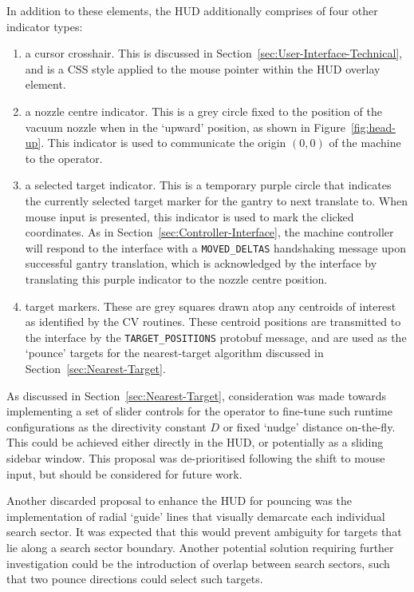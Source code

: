\documentclass[12pt,british,UKenglish]{article}
\begin{document}
In addition to these elements, the \ac{HUD} additionally comprises of four other indicator types:
\begin{enumerate}
    \item a cursor crosshair.
          This is discussed in Section~\ref{sec:User-Interface-Technical}, and is a \ac{CSS} style applied to the mouse pointer within the \ac{HUD} overlay element.
    \item a nozzle centre indicator.
          This is a grey circle fixed to the position of the vacuum nozzle when in the `upward' position, as shown in Figure~\ref{fig:head-up}.
          This indicator is used to communicate the origin $(0, 0)$ of the machine to the operator.
    \item a selected target indicator.
          This is a temporary purple circle that indicates the currently selected target marker for the gantry to next translate to.
          When mouse input is presented, this indicator is used to mark the clicked coordinates.
          As in Section~\ref{sec:Controller-Interface}, the machine controller will respond to the interface with a \texttt{MOVED\_DELTAS} handshaking message upon successful gantry translation, which is acknowledged by the interface by translating this purple indicator to the nozzle centre position.
    \item target markers.
          These are grey squares drawn atop any centroids of interest as identified by the \ac{CV} routines.
          These centroid positions are transmitted to the interface by the \texttt{TARGET\_POSITIONS} \ac{protobuf} message, and are used as the `pounce' targets for the nearest-target algorithm discussed in Section~\ref{sec:Nearest-Target}.
\end{enumerate}

As discussed in Section~\ref{sec:Nearest-Target}, consideration was made towards implementing a set of slider controls for the operator to fine-tune such runtime configurations as the directivity constant $D$ or fixed `nudge' distance on-the-fly.
This could be achieved either directly in the \ac{HUD}, or potentially as a sliding sidebar window.
This proposal was de-prioritised following the shift to mouse input, but should be considered for future work.

Another discarded proposal to enhance the \ac{HUD} for pouncing was the implementation of radial `guide' lines that visually demarcate each individual search sector.
It was expected that this would prevent ambiguity for targets that lie along a search sector boundary.
Another potential solution requiring further investigation could be the introduction of overlap between search sectors, such that two pounce directions could select such targets.
\end{document}
